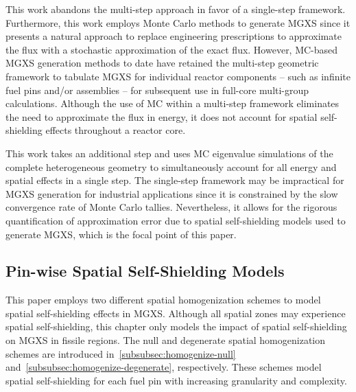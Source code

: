 This work abandons the multi-step approach in favor of a single-step framework. Furthermore, this work employs Monte Carlo methods to generate MGXS since it presents a natural approach to replace engineering prescriptions to approximate the flux with a stochastic approximation of the exact flux. However, MC-based MGXS generation methods to date have retained the multi-step geometric framework to tabulate MGXS for individual reactor components -- such as infinite fuel pins and/or assemblies -- for subsequent use in full-core multi-group calculations. Although the use of MC within a multi-step framework eliminates the need to approximate the flux in energy, it does not account for spatial self-shielding effects throughout a reactor core. 

This work takes an additional step and uses MC eigenvalue simulations of the complete heterogeneous geometry to simultaneously account for all energy and spatial effects in a single step. The single-step framework may be impractical for MGXS generation for industrial applications since it is constrained by the slow convergence rate of Monte Carlo tallies. Nevertheless, it allows for the rigorous quantification of approximation error due to spatial self-shielding models used to generate MGXS, which is the focal point of this paper.


\subsection{Pin-wise Spatial Self-Shielding Models}
\label{subsec:homogenize}


This paper employs two different spatial homogenization schemes to model spatial self-shielding effects in MGXS. Although all spatial zones may experience spatial self-shielding, this chapter only models the impact of spatial self-shielding on MGXS in fissile regions. The null and degenerate spatial homogenization schemes are introduced in~\autoref{subsubsec:homogenize-null} and~\autoref{subsubsec:homogenize-degenerate}, respectively. These schemes model spatial self-shielding for each fuel pin with increasing granularity and complexity. 


